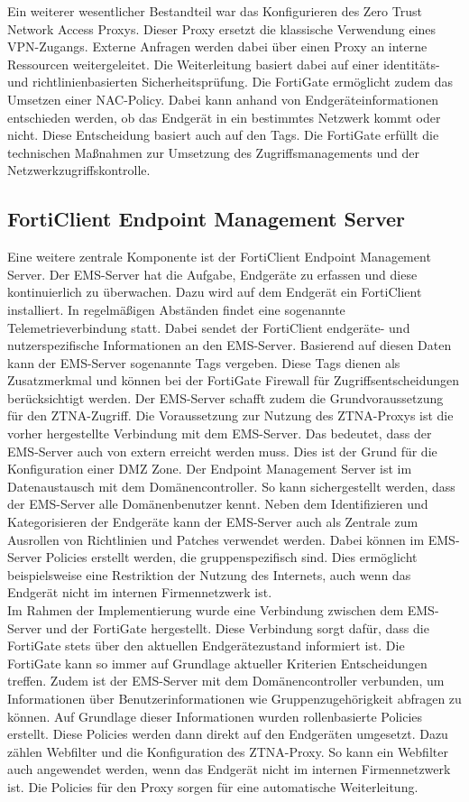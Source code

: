 \documentclass[lettersize,journal]{IEEEtran}
\begin{document}
Ein weiterer wesentlicher Bestandteil war das Konfigurieren des Zero Trust Network Access Proxys. Dieser Proxy ersetzt die klassische Verwendung eines VPN-Zugangs. Externe Anfragen werden dabei über einen Proxy an interne Ressourcen weitergeleitet. Die Weiterleitung basiert dabei auf einer identitäts- und richtlinienbasierten Sicherheitsprüfung. Die FortiGate ermöglicht zudem das Umsetzen einer NAC-Policy. Dabei kann anhand von Endgeräteinformationen entschieden werden, ob das Endgerät in ein bestimmtes Netzwerk kommt oder nicht. Diese Entscheidung basiert auch auf den Tags. Die FortiGate erfüllt die technischen Maßnahmen zur Umsetzung des Zugriffsmanagements und der Netzwerkzugriffskontrolle.

\subsection{FortiClient Endpoint Management Server}
Eine weitere zentrale Komponente ist der FortiClient Endpoint Management Server. Der EMS-Server hat die Aufgabe, Endgeräte zu erfassen und diese kontinuierlich zu überwachen. Dazu wird auf dem Endgerät ein FortiClient installiert. In regelmäßigen Abständen findet eine sogenannte Telemetrieverbindung statt. Dabei sendet der FortiClient endgeräte- und nutzerspezifische Informationen an den EMS-Server. Basierend auf diesen Daten kann der EMS-Server sogenannte Tags vergeben. Diese Tags dienen als Zusatzmerkmal und können bei der FortiGate Firewall für Zugriffsentscheidungen berücksichtigt werden. Der EMS-Server schafft zudem die Grundvoraussetzung für den ZTNA-Zugriff. Die Voraussetzung zur Nutzung des ZTNA-Proxys ist die vorher hergestellte Verbindung mit dem EMS-Server. Das bedeutet, dass der EMS-Server auch von extern erreicht werden muss. Dies ist der Grund für die Konfiguration einer DMZ Zone. Der Endpoint Management Server ist im Datenaustausch mit dem Domänencontroller. So kann sichergestellt werden, dass der EMS-Server alle Domänenbenutzer kennt. Neben dem Identifizieren und Kategorisieren der Endgeräte kann der EMS-Server auch als Zentrale zum Ausrollen von Richtlinien und Patches verwendet werden. Dabei können im EMS-Server Policies erstellt werden, die gruppenspezifisch sind. Dies ermöglicht beispielsweise eine Restriktion der Nutzung des Internets, auch wenn das Endgerät nicht im internen Firmennetzwerk ist.\\
Im Rahmen der Implementierung wurde eine Verbindung zwischen dem EMS-Server und der FortiGate hergestellt. Diese Verbindung sorgt dafür, dass die FortiGate stets über den aktuellen Endgerätezustand informiert ist. Die FortiGate kann so immer auf Grundlage aktueller Kriterien Entscheidungen treffen. Zudem ist der EMS-Server mit dem Domänencontroller verbunden, um Informationen über Benutzerinformationen wie Gruppenzugehörigkeit abfragen zu können. Auf Grundlage dieser Informationen wurden rollenbasierte Policies erstellt. Diese Policies werden dann direkt auf den Endgeräten umgesetzt. Dazu zählen Webfilter und die Konfiguration des ZTNA-Proxy. So kann ein Webfilter auch angewendet werden, wenn das Endgerät nicht im internen Firmennetzwerk ist. Die Policies für den Proxy sorgen für eine automatische Weiterleitung. 
\end{document}
